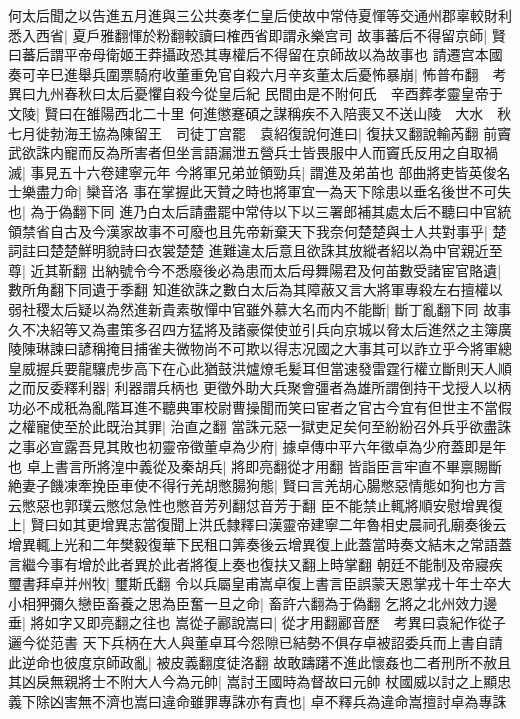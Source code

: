 何太后聞之以告進五月進與三公共奏孝仁皇后使故中常侍夏惲等交通州郡辜較財利悉入西省|{
	夏戶雅翻惲於粉翻較讀曰榷西省即謂永樂宫司}
故事蕃后不得留京師|{
	賢曰蕃后謂平帝母衛姬王莽攝政恐其專權后不得留在京師故以為故事也}
請遷宫本國奏可辛巳進舉兵圍票騎府收董重免官自殺六月辛亥董太后憂怖暴崩|{
	怖普布翻　考異曰九州春秋曰太后憂懼自殺今從皇后紀}
民間由是不附何氏　辛酉葬孝靈皇帝于文陵|{
	賢曰在雒陽西北二十里}
何進懲蹇碩之謀稱疾不入陪喪又不送山陵　大水　秋七月徙勃海王協為陳留王　司徒丁宫罷　袁紹復說何進曰|{
	復扶又翻說輸芮翻}
前竇武欲誅内寵而反為所害者但坐言語漏泄五營兵士皆畏服中人而竇氏反用之自取禍滅|{
	事見五十六卷建寧元年}
今將軍兄弟並領勁兵|{
	謂進及弟苖也}
部曲將吏皆英俊名士樂盡力命|{
	欒音洛}
事在掌握此天贊之時也將軍宜一為天下除患以垂名後世不可失也|{
	為于偽翻下同}
進乃白太后請盡罷中常侍以下以三署郎補其處太后不聽曰中官統領禁省自古及今漢家故事不可廢也且先帝新棄天下我奈何楚楚與士人共對事乎|{
	楚詞註曰楚楚鮮明貌詩曰衣裳楚楚}
進難違太后意且欲誅其放縱者紹以為中官親近至尊|{
	近其靳翻}
出納號令今不悉廢後必為患而太后母舞陽君及何苖數受諸宦官賂遺|{
	數所角翻下同遺于季翻}
知進欲誅之數白太后為其障蔽又言大將軍專殺左右擅權以弱社稷太后疑以為然進新貴素敬憚中官雖外慕大名而内不能斷|{
	斷丁亂翻下同}
故事久不决紹等又為畫策多召四方猛將及諸豪傑使並引兵向京城以脅太后進然之主簿廣陵陳琳諫曰諺稱掩目捕雀夫微物尚不可欺以得志况國之大事其可以詐立乎今將軍總皇威握兵要龍驤虎步高下在心此猶鼓洪爐燎毛髪耳但當速發雷霆行權立斷則天人順之而反委釋利器|{
	利器謂兵柄也}
更徵外助大兵聚會彊者為雄所謂倒持干戈授人以柄功必不成秖為亂階耳進不聽典軍校尉曹操聞而笑曰宦者之官古今宜有但世主不當假之權寵使至於此既治其罪|{
	治直之翻}
當誅元惡一獄吏足矣何至紛紛召外兵乎欲盡誅之事必宣露吾見其敗也初靈帝徵董卓為少府|{
	據卓傳中平六年徵卓為少府蓋即是年也}
卓上書言所將湟中義從及秦胡兵|{
	將即亮翻從才用翻}
皆詣臣言牢直不畢禀賜斷絶妻子饑凍牽挽臣車使不得行羌胡憋腸狗態|{
	賢曰言羌胡心腸憋惡情態如狗也方言云憋惡也郭璞云憋怤急性也憋音芳列翻怤音芳于翻}
臣不能禁止輒將順安慰增異復上|{
	賢曰如其更增異志當復聞上洪氏隸釋曰漢靈帝建寧二年魯相史晨祠孔廟奏後云增異輒上光和二年樊毅復華下民租口筭奏後云增異復上此蓋當時奏文結末之常語蓋言繼今事有增於此者異於此者將復上奏也復扶又翻上時掌翻}
朝廷不能制及帝寢疾璽書拜卓并州牧|{
	璽斯氏翻}
令以兵屬皇甫嵩卓復上書言臣誤蒙天恩掌戎十年士卒大小相狎彌久戀臣畜養之思為臣奮一旦之命|{
	畜許六翻為于偽翻}
乞將之北州效力邊垂|{
	將如字又即亮翻之往也}
嵩從子酈說嵩曰|{
	從才用翻酈音歷　考異曰袁紀作從子邐今從范書}
天下兵柄在大人與董卓耳今怨隙已結勢不俱存卓被詔委兵而上書自請此逆命也彼度京師政亂|{
	被皮義翻度徒洛翻}
故敢躊躇不進此懷姦也二者刑所不赦且其凶戾無親將士不附大人今為元帥|{
	嵩討王國時為督故曰元帥}
杖國威以討之上顯忠義下除凶害無不濟也嵩曰違命雖罪專誅亦有責也|{
	卓不釋兵為違命嵩擅討卓為專誅}
